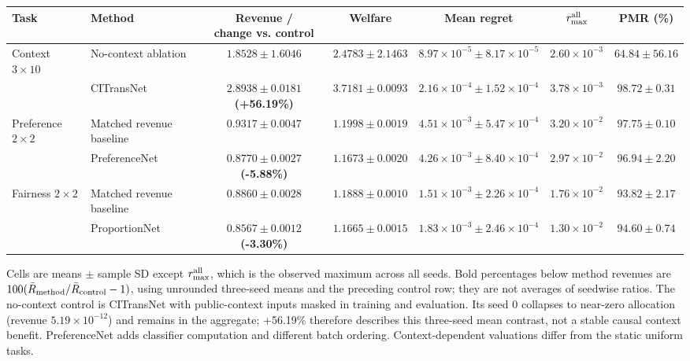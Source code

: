 \begin{table}[!t]
\centering\footnotesize
{}
\label{tab:phase3quant}
\setlength{\tabcolsep}{4pt}
\begin{tabular}{llccccc}
\toprule
Task & Method & \makecell{Revenue /\\change vs. control} & Welfare & Mean regret & $r_{\max}^{\rm all}$ & PMR (\%) \\
\midrule
Context $3\times10$ & No-context ablation & $1.8528\pm 1.6046$ & $2.4783\pm 2.1463$ & $8.97\times10^{-5}\pm 8.17\times10^{-5}$ & $2.60\times10^{-3}$ & $64.84\pm 56.16$ \\
 & CITransNet & \makecell{$2.8938\pm 0.0181$\\ \textbf{(+56.19\%)}} & $3.7181\pm 0.0093$ & $2.16\times10^{-4}\pm 1.52\times10^{-4}$ & $3.78\times10^{-3}$ & $98.72\pm 0.31$ \\
Preference $2\times2$ & Matched revenue baseline & $0.9317\pm 0.0047$ & $1.1998\pm 0.0019$ & $4.51\times10^{-3}\pm 5.47\times10^{-4}$ & $3.20\times10^{-2}$ & $97.75\pm 0.10$ \\
 & PreferenceNet & \makecell{$0.8770\pm 0.0027$\\ \textbf{(-5.88\%)}} & $1.1673\pm 0.0020$ & $4.26\times10^{-3}\pm 8.40\times10^{-4}$ & $2.97\times10^{-2}$ & $96.94\pm 2.20$ \\
Fairness $2\times2$ & Matched revenue baseline & $0.8860\pm 0.0028$ & $1.1888\pm 0.0010$ & $1.51\times10^{-3}\pm 2.26\times10^{-4}$ & $1.76\times10^{-2}$ & $93.82\pm 2.17$ \\
 & ProportionNet & \makecell{$0.8567\pm 0.0012$\\ \textbf{(-3.30\%)}} & $1.1665\pm 0.0015$ & $1.83\times10^{-3}\pm 2.46\times10^{-4}$ & $1.30\times10^{-2}$ & $94.60\pm 0.74$ \\
\bottomrule
\end{tabular}
\par\smallskip\begin{minipage}{0.98\textwidth}\footnotesize Cells are means $\pm$ sample SD except $r_{\max}^{\rm all}$, which is the observed maximum across all seeds. Bold percentages below method revenues are $100(\bar R_{\rm method}/\bar R_{\rm control}-1)$, using unrounded three-seed means and the preceding control row; they are not averages of seedwise ratios. The no-context control is CITransNet with public-context inputs masked in training and evaluation. Its seed 0 collapses to near-zero allocation (revenue $5.19\times10^{-12}$) and remains in the aggregate; +56.19\% therefore describes this three-seed mean contrast, not a stable causal context benefit. PreferenceNet adds classifier computation and different batch ordering. Context-dependent valuations differ from the static uniform tasks.\end{minipage}
\end{table}
